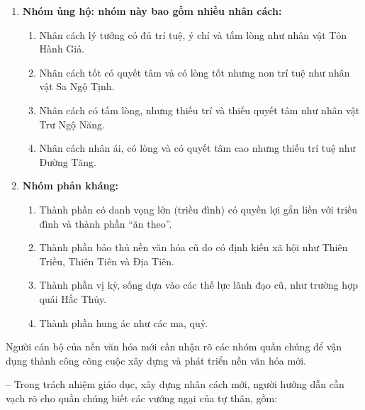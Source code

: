 \begin{enumerate}[label=\itshape\arabic*\upshape)]

    \item {\bf Nhóm ủng hộ: nhóm này bao gồm nhiều nhân cách:}

    \begin{enumerate}[label=\itshape\alph*\upshape/]

        \item Nhân cách lý tưởng có đủ trí tuệ, ý chí và tấm lòng như nhân vật Tôn Hành Giả.

        \item Nhân cách tốt có quyết tâm và có lòng tốt nhưng non trí tuệ như nhân vật Sa Ngộ Tịnh.

        \item Nhân cách có tấm lòng, nhưng thiếu trí và thiếu quyết tâm như nhân vật Trư Ngộ Năng.

        \item Nhân cách nhân ái, có lòng và có quyết tâm cao nhưng thiếu trí tuệ như Đường Tăng.
    \end{enumerate}

    \item {\bf Nhóm phản kháng:}

    \begin{enumerate}[label=\itshape\alph*\upshape/]

        \item Thành phần có danh vọng lớn (triều đình) có quyền lợi gắn liền với triều đình và thành phần ``ăn theo''.

        \item Thành phần bảo thủ nền văn hóa cũ do có định kiến xã hội như Thiên Triều, Thiên Tiên và Địa Tiên.

        \item Thành phần vị kỷ, sống dựa vào các thế lực lãnh đạo cũ, như trường hợp quái Hắc Thủy.

        \item Thành phần hung ác như các ma, quỷ.
    \end{enumerate}
\end{enumerate}

Người cán bộ của nền văn hóa mới cần nhận rõ các nhóm quần chúng để vận dụng thành công công cuộc xây dựng và phát triển nền văn hóa mới.

-- Trong trách nhiệm giáo dục, xây dựng nhân cách mới, người hướng dẫn cần vạch rõ cho quần chúng biết các vướng ngại của tự thân, gồm:

